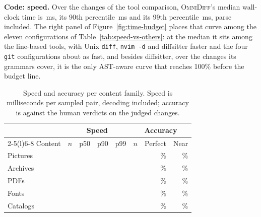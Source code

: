 \documentclass[sigconf,review]{acmart}
\begin{document}
\textbf{Code: speed.} Over the \OmniDiffFixtures{} changes of the tool comparison,
\textsc{OmniDiff}'s median wall-clock time is \SpeedOmniDiffPFifty{}\,ms, its 90th percentile
\SpeedOmniDiffPNinety{}\,ms and its 99th percentile \SpeedOmniDiffPNinetyNine{}\,ms, parse
included. The right panel of Figure~\ref{fig:time-budget} places that curve among the eleven
configurations of Table~\ref{tab:speed-vs-others}: at the median it sits among the line-based
tools, with Unix \texttt{diff}, \texttt{nvim -d} and diffsitter faster and the four \texttt{git}
configurations about as fast, and besides diffsitter, over the \DiffsitterFixtures{}
changes its grammars cover, it is the only AST-aware curve that reaches 100\% before the budget
line.

\begin{table}
  \caption{Speed and accuracy per content family. Speed is milliseconds per sampled pair,
  decoding included; accuracy is against the human verdicts on the judged changes.}
  \label{tab:content}
  \small
  \setlength{\tabcolsep}{3.5pt}
  \begin{tabular}{@{}lrrrrrrr@{}}
    \toprule
    & \multicolumn{4}{c}{Speed} & \multicolumn{3}{c}{Accuracy} \\
    \cmidrule(lr){2-5}\cmidrule(l){6-8}
    Content & $n$ & p50 & p90 & p99 & $n$ & Perfect & Near \\
    \midrule
    Pictures & \ContentSpeedPicturesPairs{} & \ContentSpeedPicturesPFifty{} & \ContentSpeedPicturesPNinety{} & \ContentSpeedPicturesPNinetyNine{} & \ContentAccPicturesJudged{} & \ContentAccPicturesPerfectPct{}\% & \ContentAccPicturesNearPerfectPct{}\% \\
    Archives & \ContentSpeedArchivesPairs{} & \ContentSpeedArchivesPFifty{} & \ContentSpeedArchivesPNinety{} & \ContentSpeedArchivesPNinetyNine{} & \ContentAccArchivesJudged{} & \ContentAccArchivesPerfectPct{}\% & \ContentAccArchivesNearPerfectPct{}\% \\
    PDFs & \ContentSpeedPdfsPairs{} & \ContentSpeedPdfsPFifty{} & \ContentSpeedPdfsPNinety{} & \ContentSpeedPdfsPNinetyNine{} & \ContentAccPdfsJudged{} & \ContentAccPdfsPerfectPct{}\% & \ContentAccPdfsNearPerfectPct{}\% \\
    Fonts & \ContentSpeedFontsPairs{} & \ContentSpeedFontsPFifty{} & \ContentSpeedFontsPNinety{} & \ContentSpeedFontsPNinetyNine{} & \ContentAccFontsJudged{} & \ContentAccFontsPerfectPct{}\% & \ContentAccFontsNearPerfectPct{}\% \\
    Catalogs & \ContentSpeedCatalogsPairs{} & \ContentSpeedCatalogsPFifty{} & \ContentSpeedCatalogsPNinety{} & \ContentSpeedCatalogsPNinetyNine{} & \ContentAccCatalogsJudged{} & \ContentAccCatalogsPerfectPct{}\% & \ContentAccCatalogsNearPerfectPct{}\% \\

\end{tabular}
\end{table}
\end{document}
